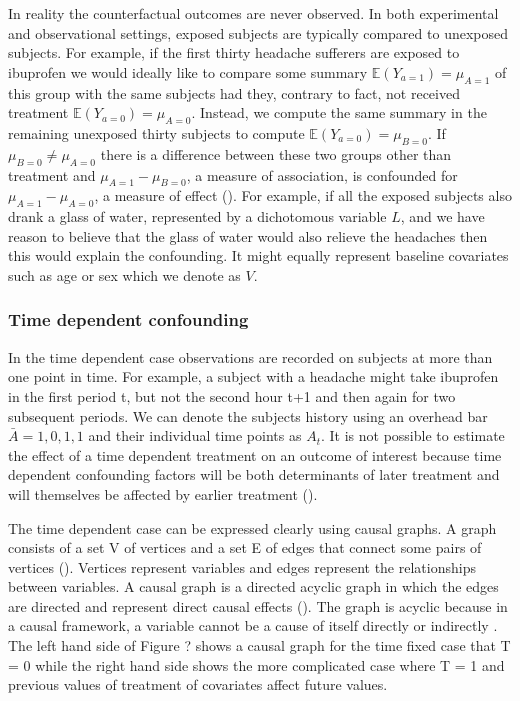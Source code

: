 \documentclass[11pt]{article}
\begin{document}
In reality the counterfactual outcomes are never observed. In both
experimental and observational settings, exposed subjects are typically
compared to unexposed subjects. For example, if the first thirty
headache sufferers are exposed to ibuprofen we would ideally like to
compare some summary \(\mathbb{E}(Y_{a = 1}) = \mu_{A=1}\) of this group
with the same subjects had they, contrary to fact, not received
treatment \(\mathbb{E}(Y_{a = 0}) = \mu_{A=0}\). Instead, we compute the
same summary in the remaining unexposed thirty subjects to compute
\(\mathbb{E}(Y_{a = 0}) = \mu_{B=0}\). If \(\mu_{B=0} \neq \mu_{A=0}\)
there is a difference between these two groups other than treatment and
\(\mu_{A=1} - \mu_{B=0}\), a measure of association, is confounded for
\(\mu_{A=1} - \mu_{A=0}\), a measure of effect (\citet{Greenland1999}).
For example, if all the exposed subjects also drank a glass of water,
represented by a dichotomous variable \(L\), and we have reason to
believe that the glass of water would also relieve the headaches then
this would explain the confounding. It might equally represent baseline
covariates such as age or sex which we denote as \(V\).

    \subsubsection{Time dependent
confounding}\label{time-dependent-confounding}

In the time dependent case observations are recorded on subjects at more
than one point in time. For example, a subject with a headache might
take ibuprofen in the first period t, but not the second hour t+1 and
then again for two subsequent periods. We can denote the subjects
history using an overhead bar \(\bar A = {1, 0, 1, 1}\) and their
individual time points as \(A_t\). It is not possible to estimate the
effect of a time dependent treatment on an outcome of interest because
time dependent confounding factors will be both determinants of later
treatment and will themselves be affected by earlier treatment
(\citet{Robins2000a}).

The time dependent case can be expressed clearly using causal graphs. A
graph consists of a set V of vertices and a set E of edges that connect
some pairs of vertices (\citet{Pearl2009}). Vertices represent variables
and edges represent the relationships between variables. A causal graph
is a directed acyclic graph in which the edges are directed and
represent direct causal effects (\citet{Robins2000}). The graph is
acyclic because in a causal framework, a variable cannot be a cause of
itself directly or indirectly \citet{Hernan2004}. The left hand side of
Figure ? shows a causal graph for the time fixed case that T = 0 while
the right hand side shows the more complicated case where T = 1 and
previous values of treatment of covariates affect future values.
\end{document}
